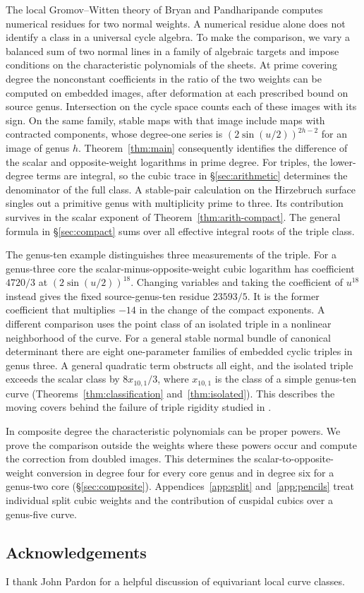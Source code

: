The local Gromov--Witten theory of Bryan and Pandharipande \cite{BP}
computes numerical residues for two normal weights. A numerical
residue alone does not identify a class in a universal cycle algebra.
To make the comparison, we vary a balanced sum of two normal lines
in a family of algebraic targets and impose conditions on the
characteristic polynomials of the sheets. At prime covering degree
the nonconstant coefficients in the ratio of the two weights can be
computed on embedded images, after deformation at each prescribed
bound on source genus. Intersection on the cycle space counts each
of these images with its sign. On the same family, stable maps with
that image include maps with contracted components, whose degree-one
series is $(2\sin(u/2))^{2h-2}$ for an image of genus $h$.
Theorem~\ref{thm:main} consequently identifies the difference of the
scalar and opposite-weight logarithms in prime degree. For triples,
the lower-degree terms are integral, so the cubic trace in
\S\ref{sec:arithmetic} determines the denominator of the full class.
A stable-pair calculation on the Hirzebruch surface singles out a
primitive genus with multiplicity prime to three. Its contribution
survives in the scalar exponent of Theorem~\ref{thm:arith-compact}.
The general formula in \S\ref{sec:compact} sums over all effective
integral roots of the triple class.

The genus-ten example distinguishes three measurements of the triple.
For a genus-three core the scalar-minus-opposite-weight cubic
logarithm has coefficient $4720/3$ at $(2\sin(u/2))^{18}$. Changing
variables and taking the coefficient of $u^{18}$ instead gives the
fixed source-genus-ten residue $23593/5$. It is the former coefficient
that multiplies $-14$ in the change of the compact exponents.
A different comparison uses the point class of an isolated triple in a
nonlinear neighborhood of the curve. For a general stable normal bundle of
canonical determinant there are eight one-parameter families of
embedded cyclic triples in genus three. A general quadratic term
obstructs all eight, and the isolated triple exceeds the scalar class
by $8x_{10,1}/3$, where $x_{10,1}$ is the class of a simple genus-ten
curve (Theorems~\ref{thm:classification} and~\ref{thm:isolated}).
This describes the moving covers behind the failure of triple
rigidity studied in \cite{BP06}.

In composite degree the characteristic polynomials can be proper
powers. We prove the comparison outside the weights where these
powers occur and compute the correction from doubled images. This
determines the scalar-to-opposite-weight conversion in degree four
for every core genus and in degree six for a genus-two core
(\S\ref{sec:composite}). Appendices~\ref{app:split}
and~\ref{app:pencils} treat individual split cubic weights and
the contribution of cuspidal cubics over a genus-five curve.

\subsection*{Acknowledgements}
I thank John Pardon for a helpful discussion of equivariant local curve classes.
